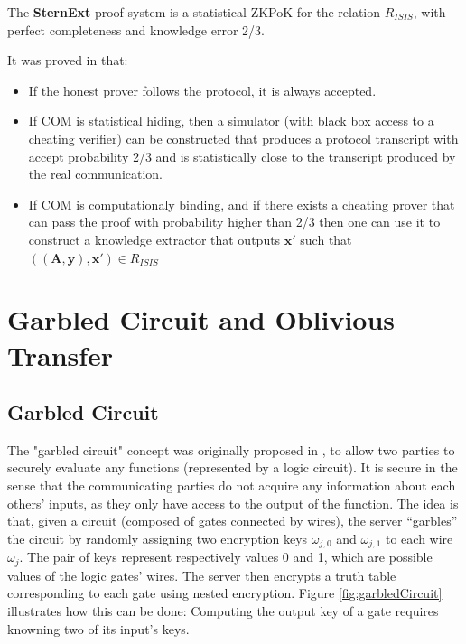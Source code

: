 \begin{theorem}
   The \textbf{SternExt} proof system is a statistical ZKPoK for the relation $R_{ISIS}$, with perfect completeness and knowledge error 2/3.
\end{theorem}

It was proved in \cite{ling2013improved} that:
\begin{itemize}
\item If the honest prover follows the protocol, it is always accepted.
\item If COM is statistical hiding, then a simulator (with black box access to a
  cheating verifier) can be constructed that produces a protocol transcript with
  accept probability 2/3 and is statistically close to the transcript produced
  by the real communication.
\item If COM is computationaly binding, and if there exists a cheating prover that can pass the proof with probability higher than 2/3 then one can use it to construct a knowledge extractor that outputs $\mathbf{x'}$ such that $(\mathbf{(A,y),x'}) \in R_{ISIS}$
\end{itemize}

\section{Garbled Circuit and Oblivious Transfer}
\label{sec:defMPP}

\subsection{Garbled Circuit}
\label{sec:garbledCircuitPre}

The "garbled circuit" concept was originally proposed in \cite{yao1986generate}, to
allow two parties to securely evaluate any functions (represented by a logic
circuit). It is secure in the sense that the communicating parties do not acquire
any information about each others' inputs, as they only have access to the output of the
function. The idea is that, given a circuit (composed of gates connected by
wires), the server ``garbles'' the circuit by randomly assigning two encryption
keys \(\omega_{j,0}\) and \(\omega_{j,1}\) to each wire \(\omega_{j}\). The pair
of keys represent respectively values 0 and 1, which are possible values of the
logic gates' wires. The server then encrypts a truth table corresponding to each
gate using nested encryption. Figure \ref{fig:garbledCircuit} illustrates how
this can be done: Computing the output key of a gate requires knowning two of
its input's keys.

